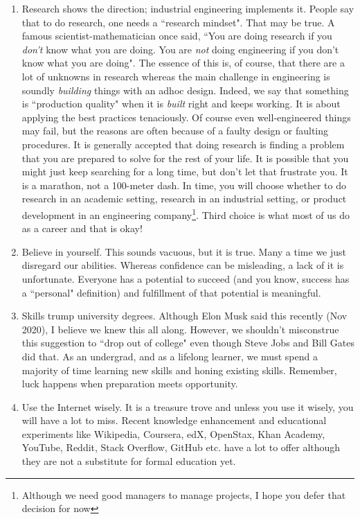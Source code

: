 \documentclass[12pt]{article}
\begin{document}
\begin{enumerate}
    \item Research shows the direction; industrial engineering implements it. People say that to do research, one needs a ``research mindset". That may be true. A famous scientist-mathematician \cite{hamming} once said, ``You are doing research if you \emph{don't} know what you are doing. You are \emph{not} doing engineering if you don't know what you are doing". The essence of this is, of course, that there are a lot of unknowns in research whereas the main challenge in engineering is soundly \emph{building} things with an adhoc design. Indeed, we say that something is ``production quality" when it is \emph{built} right and keeps working. It is about applying the best practices tenaciously. Of course even well-engineered things may fail, but the reasons are often because of a faulty design or faulting procedures.  It is generally accepted that doing research is finding a problem that you are prepared to solve for the rest of your life. It is possible that you might just keep searching for a long time, but don't let that frustrate you. It is a marathon, not a 100-meter dash. In time, you will choose whether to do research in an academic setting, research in an industrial setting, or product development in an engineering company\footnote{Although we need good managers to manage projects, I hope you defer that decision for now}. Third choice is what most of us do as a career and that is okay!
    \item Believe in yourself. This sounds vacuous, but it is true. Many a time we just disregard our abilities. Whereas confidence can be misleading, a lack of it is unfortunate. Everyone has a potential to succeed (and you know, success has a ``personal" definition) and fulfillment of that potential is meaningful. 
    \item Skills trump university degrees. Although Elon Musk said this recently (Nov 2020), I believe we knew this all along. However, we shouldn't misconstrue this suggestion to ``drop out of college" even though Steve Jobs and Bill Gates did that. As an undergrad, and as a lifelong learner, we must spend a majority of time learning new skills and honing existing skills. Remember, luck happens when preparation meets opportunity.
    \item Use the Internet wisely. It is a treasure trove and unless you use it wisely, you will have a lot to miss. Recent knowledge enhancement and educational experiments like Wikipedia, Coursera, edX, OpenStax, Khan Academy, YouTube, Reddit, Stack Overflow, GitHub etc. have a lot to offer although they are not a substitute for formal education yet.
\end{enumerate}
\end{document}
